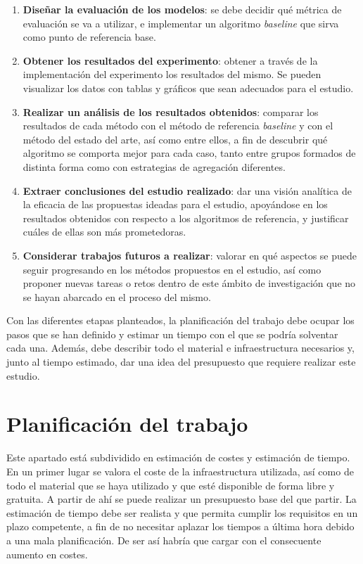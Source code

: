\begin{enumerate}
	\item{\textbf{Diseñar la evaluación de los modelos}: se debe decidir qué métrica de evaluación se va a utilizar, e implementar un algoritmo \textit{baseline} que sirva como punto de referencia base.} 
	\item{\textbf{Obtener los resultados del experimento}: obtener a través de la implementación del experimento los resultados del mismo. Se pueden visualizar los datos con tablas y gráficos que sean adecuados para el estudio.}
	\item{\textbf{Realizar un análisis de los resultados obtenidos}: comparar los resultados de cada método con el método de referencia \textit{baseline} y con el método del estado del arte, así como entre ellos, a fin de descubrir qué algoritmo se comporta mejor para cada caso, tanto entre grupos formados de distinta forma como con estrategias de agregación diferentes.}
	\item{\textbf{Extraer conclusiones del estudio realizado}: dar una visión analítica de la eficacia de las propuestas ideadas para el estudio, apoyándose en los resultados obtenidos con respecto a los algoritmos de referencia, y justificar cuáles de ellas son más prometedoras.}
	\item{\textbf{Considerar trabajos futuros a realizar}: valorar en qué aspectos se puede seguir progresando en los métodos propuestos en el estudio, así como proponer nuevas tareas o retos dentro de este ámbito de investigación que no se hayan abarcado en el proceso del mismo.}
\end{enumerate}

Con las diferentes etapas planteados, la planificación del trabajo debe ocupar los pasos que se han definido y estimar un tiempo con el que se podría solventar cada una. Además, debe describir todo el material e infraestructura necesarios y, junto al tiempo estimado, dar una idea del presupuesto que requiere realizar este estudio.

\section{Planificación del trabajo}

Este apartado está subdividido en estimación de costes y estimación de tiempo. En un primer lugar se valora el coste de la infraestructura utilizada, así como de todo el material que se haya utilizado y que esté disponible de forma libre y gratuita. A partir de ahí se puede realizar un presupuesto base del que partir. La estimación de tiempo debe ser realista y que permita cumplir los requisitos en un plazo competente, a fin de no necesitar aplazar los tiempos a última hora debido a una mala planificación. De ser así habría que cargar con el consecuente aumento en costes.

